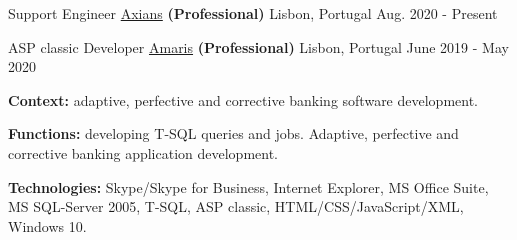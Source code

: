 \begin{cventries}

\vspace{-0.25cm}

  \cventry
    {Support Engineer} %
    {\href{https://www.axians.pt/pt/}{Axians} \textbf{(Professional)}} %
    {Lisbon, Portugal} %
    {Aug. 2020 - Present} %
    {
    } 

  \cventry
    {ASP classic Developer} %
    {\href{https://www.amaris.com/}{Amaris} \textbf{(Professional)}} %
    {Lisbon, Portugal} %
    {June 2019 - May 2020} %
    {
      \begin{cvitems} %
		\item[] {\textbf{Context:} adaptive, perfective and corrective banking software development. 
}
		\item[] {\textbf{Functions:} developing T-SQL queries and jobs. Adaptive, perfective and corrective banking application development.}		
		\item[] {\textbf{Technologies:} \textcolor{rainbowcolor-olive}{Skype/Skype for Business}, \textcolor{rainbowcolor-olive}{Internet Explorer}, \textcolor{rainbowcolor-olive}{MS Office Suite}, \textcolor{rainbowcolor-olive}{MS SQL-Server 2005}, \textcolor{rainbowcolor-indigo}{T-SQL}, \textcolor{rainbowcolor-indigo}{ASP classic}, \textcolor{rainbowcolor-indigo}{HTML/CSS/JavaScript/XML},  \textcolor{rainbowcolor-orange}{Windows 10}.}		
      \end{cvitems}
    } 
    

\end{cventries}
